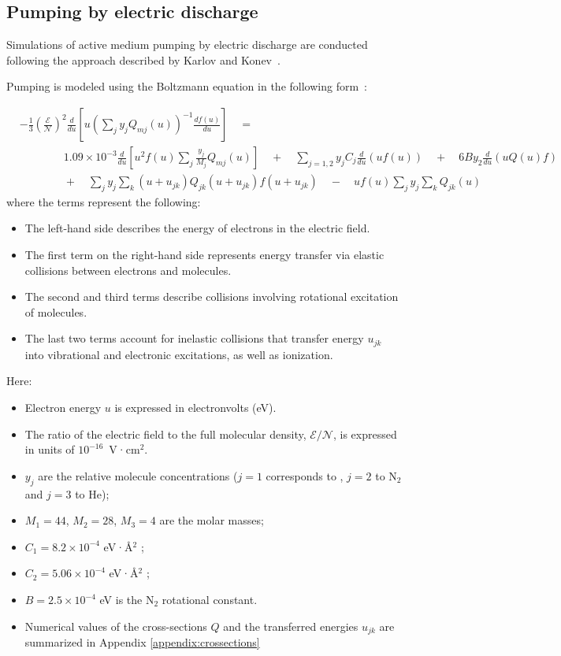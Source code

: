 \subsection{Pumping by electric discharge}

Simulations of active medium pumping by electric discharge are conducted following the approach described by Karlov and Konev~\cite{Karlov-1978}.

Pumping is modeled using the Boltzmann equation in the following form~\cite{Holstein-1946, Nighan-1970}:

\begin{align}\label{eq:boltzmann}
&- \frac{1}{3} \left(\frac{\mathcal{E}}{\mathcal{N}}\right)^2 \frac{d}{du} \left[u \left( \sum\limits_j y_j Q_{mj}(u) \right)^{-1}\frac{df(u)}{du} \right] \quad = \nonumber \\
&\qquad \qquad 1.09 \times 10^{ - 3}\frac{d}{du}\left[ u^2 f(u)\sum\limits_j \frac{y_j}{M_j} Q_{mj}(u) \right]
\quad  + \quad \sum\limits_{j = 1,2} {y_j}{C_j} \frac{d}{du}(uf(u))
\quad  + \quad 6B y_2 \frac{d}{du}\left(uQ(u)f \right)\nonumber \\
&\qquad \qquad +\quad\sum\limits_j y_j \sum\limits_k (u + u_{jk})Q_{jk} (u + u_{jk})f(u + u_{jk}) \quad  - \quad uf(u)\sum\limits_j y_j \sum\limits_k Q_{jk}(u)
\end{align}
where the terms represent the following:
\begin{itemize}
    \item The left-hand side describes the energy of electrons in the electric field.
    \item The first term on the right-hand side represents energy transfer via elastic collisions between electrons and molecules.
    \item The second and third terms describe collisions involving rotational excitation of molecules.
    \item The last two terms account for inelastic collisions that transfer energy $u_{jk}$ into vibrational and electronic excitations, as well as ionization.
\end{itemize}
Here:
\begin{itemize}
    \item Electron energy $u$ is expressed in electronvolts (eV).
    \item The ratio of the electric field to the full molecular density, $\mathcal{E}/\mathcal{N}$, is expressed in units of $10^{-16}$~V·cm$^2$.
    \item $y_j$ are the relative molecule concentrations ($j=1$ corresponds to , $j=2$ to N$_2$ and $j=3$ to He);
    \item $M_1=44$, $M_2=28$, $M_3=4$ are the molar masses;
    \item $C_1 = 8.2 \times 10^{-4}$ eV·Å$^2$ \cite{Hake-1967};
    \item $C_2 = 5.06 \times 10^{-4}$ eV·Å$^2$ \cite{Frost-1962};
    \item $B = 2.5 \times 10^{-4}$ eV is the N$_2$ rotational constant.
    \item Numerical values of the cross-sections $Q$ and the transferred energies $u_{jk}$ are summarized in Appendix \ref{appendix:crossections} 
\end{itemize}

